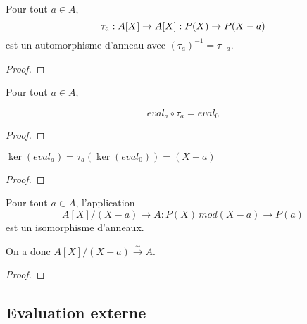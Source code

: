 \begin{proposition}
	Pour tout $a \in A$,
	\begin{equation}
		\tau_{a} : A[X] \rightarrow A[X] : P(X) \rightarrow P(X - a)
	\end{equation}
	est un automorphisme d'anneau avec $(\tau_{a})^{-1} = \tau_{-a}$.
\end{proposition}

\ifdefined\outputproof
\begin{proof}

\end{proof}
\fi

\begin{proposition}
	Pour tout $a \in A$,

	\begin{equation}
		eval_{a} \circ \tau_{a} = eval_{0}
	\end{equation}

\end{proposition}

\ifdefined\outputproof
\begin{proof}

\end{proof}
\fi

\begin{corollary}
	$\ker(eval_{a}) = \tau_{a}(\ker(eval_{0})) = (X - a)$
\end{corollary}

\ifdefined\outputproof
\begin{proof}

\end{proof}
\fi

\begin{proposition}
	Pour tout $a \in A$, l'application
	\begin{equation}
		A[X] / (X - a) \rightarrow A : P(X) \, mod(X - a) \rightarrow P(a)
	\end{equation}
	est un isomorphisme d'anneaux.

	On a donc $A[X] / (X - a) \xrightarrow{\sim} A$.
\end{proposition}

\ifdefined\outputproof
\begin{proof}

\end{proof}
\fi

\subsection{Evaluation externe}

